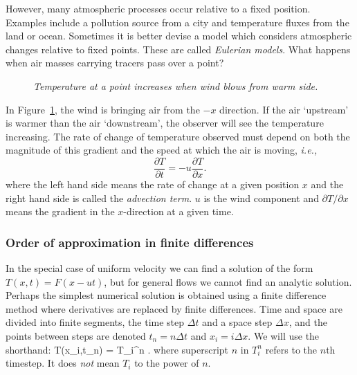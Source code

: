 However, many atmospheric processes occur relative to a fixed
position. Examples include a pollution source from a city and
temperature fluxes from the land or ocean. Sometimes it is better
devise a model which considers atmospheric changes relative to fixed
points. These are called {\em Eulerian
	models}. What happens when air masses carrying tracers pass over a
point?

\begin{figure}
	\begin{center}
	\end{center}
	\caption{\textsl{Temperature at a point increases when wind blows from warm side.}}
	\label{fig:ken}
\end{figure}

In Figure~\ref{fig:ken}, the wind is bringing air from the $-x$
direction. If the air `upstream' is warmer than the air `downstream',
the observer will see the temperature increasing. The rate of change of
temperature observed must depend on both the magnitude of this
gradient and the speed at which the air is moving, {\em i.e.,}
\begin{equation}
	\frac{\partial T}{\partial t} =- u \frac{\partial T}{\partial x}.
	\label{advectioncont}
\end{equation}
where the left hand side means the rate of change at a given position
$x$ and the right hand side is called the {\em advection term}. $u$ is
the wind component and $\partial T/\partial x$ means the gradient in
the $x$-direction at a given time. 

\subsubsection{Order of approximation in finite differences}

In the special case of uniform velocity we can find a solution of the
form $T(x,t)=F(x-ut)$, but for general flows we cannot find an analytic
solution. Perhaps the simplest numerical solution is obtained using a
finite difference method where derivatives are replaced by finite
differences. Time and space are divided into finite segments, the time
step $\Delta t$ and a space step $\Delta x$, and the points between
steps are denoted $t_n=n\Delta t$ and $x_i=i\Delta x$.  We will use
the shorthand: 
\BEQ T(x_i,t_n) = T_i^n . \EEQ 
where superscript $n$ in
$T_i^n$ refers to the $n$th timestep.  It does \emph{not} mean $T_i$
to the power of $n$.


